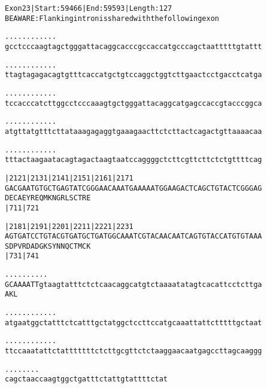 \documentclass{article}
\begin{document}
\newpage
\begin{alltt}
Exon 23 | Start: 59466 | End: 59593 | Length: 127
BE AWARE: Flanking intron is shared with the following exon

.    .    .    .    .    .    .    .    .    .    .    .
gcctcccaagtagctgggattacaggcacccgccaccatgcccagctaatttttgtattt



.    .    .    .    .    .    .    .    .    .    .    .
ttagtagagacagtgtttcaccatgctgtccaggctggtcttgaactcctgacctcatga



.    .    .    .    .    .    .    .    .    .    .    .
tccacccatcttggcctcccaaagtgctgggattacaggcatgagccaccgtacccggca



.    .    .    .    .    .    .    .    .    .    .    .
atgttatgtttcttataaagagaggtgaaagaacttctcttactcagactgttaaaacaa



.    .    .    .    .    .    .    .    .    .    .    .
tttactaagaatacagtagactaagtaatccaggggctcttcgttcttctctgttttcag



        |2121     |2131     |2141     |2151     |2161     |2171
GACGAATGTGCTGAGTATCGGGAACAAATGAAAAATGGAAGACTCAGCTGTACTCGGGAG
D  E  C  A  E  Y  R  E  Q  M  K  N  G  R  L  S  C  T  R  E
                  |711                          |721

        |2181     |2191     |2201     |2211     |2221     |2231
AGTGATCCTGTACGTGATGCTGATGGCAAATCGTACAACAATCAGTGTACCATGTGTAAA
S  D  P  V  R  D  A  D  G  K  S  Y  N  N  Q  C  T  M  C  K
                  |731                          |741

            .    .    .    .    .    .    .    .    .    .
GCAAAATTgtaagtatttctctcaacaggcatgtctaaaatatagtcacattcctcttga
A  K  L


\end{alltt}
\newpage
\begin{alltt}
  .    .    .    .    .    .    .    .    .    .    .    .
atgaatggctatttctcatttgctatggctccttccatgcaaattattctttttgctaat



  .    .    .    .    .    .    .    .    .    .    .    .
ttccaaatattctatttttttctcttgcgttctctaaggaacaatgagccttagcaaggg



  .    .    .    .    .    .    .    .
cagctaaccaagtggctgatttctattgtattttctat


\end{alltt}
\end{document}
